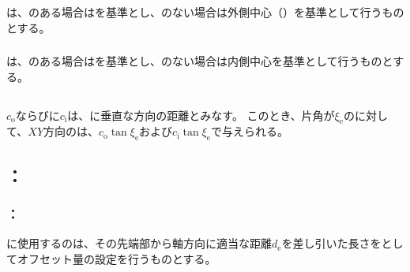 \subsubsection{\EndFaceOutCChamferMillingReferencePoint}
\EndFaceOutCChamferMillingReferencePoint は、\Outcut のある場合は\OutcutCenter を基準とし、\Outcut のない場合は外側中心（\nameEndFace）を基準として行うものとする。

\subsubsection{\EndFaceInCChamferMillingReferencePoint}
\EndFaceInCChamferMillingReferencePoint は、\IncutBoring のある場合は\IncutBoringCenter を基準とし、\IncutBoring のない場合は内側中心を基準として行うものとする。


\subsection{\EndFaceCChamferMillingDimension}
\EndFaceOutCChamferLength$c_\mathrm o$ならびに\EndFaceInCChamferLength$c_\mathrm i$は、\EndFace に垂直な方向の距離とみなす。
このとき、片角が$\xi_\mathrm e$の\TaperEndMill に対して、$XY$方向の\EndFaceCChamferLength は、$c_\mathrm o\tan\xi_\mathrm e$および$c_\mathrm i\tan\xi_\mathrm e$で与えられる。


\subsection{\indexTCEndFaceCChamferMilling\nameToolCorrection：\EndFaceCChamferMilling}

\subsubsection{\indexTLCEndFaceCChamferMilling\nameTLCorrection：\EndFaceCChamferMilling}
\EndFaceCChamferMilling に使用する\indexTLTaperEndMill\nameTaperEndMill の\nameToolLength は、その先端部から軸方向に適当な距離$d_\mathrm e$を差し引いた長さを\ToolLength としてオフセット量の設定を行うものとする。

